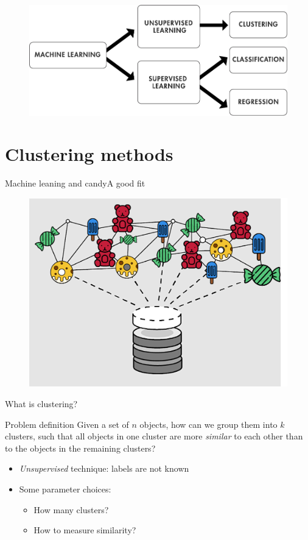 \documentclass[aspectratio=169]{beamer}
\begin{document}
  \begin{frame}{}
    \begin{figure}
      \includegraphics[width=0.75\linewidth]{Figures/Machine_learning_pipeline}
    \end{figure}
  \end{frame}

  \section{Clustering methods}

  \begin{frame}{Machine leaning and candy}{A good fit}
    \begin{figure}
      \includegraphics[width=0.50\linewidth]{Figures/Introduction}
    \end{figure}
  \end{frame}
  
  \begin{frame}{What is clustering?}

    \begin{block}{Problem definition}
      Given a set of $n$ objects, how can we group them into $k$
      clusters, such that all objects in one cluster are more
      \emph{similar} to each other than to the objects in the
      remaining clusters?
    \end{block}

    \vfill

    \begin{itemize}
      \item \emph{Unsupervised} technique: labels are not known
      \item Some parameter choices:
        \begin{itemize}
          \item How many clusters?
          \item How to measure similarity?
        \end{itemize}
    \end{itemize}
  \end{frame}
\end{document}
